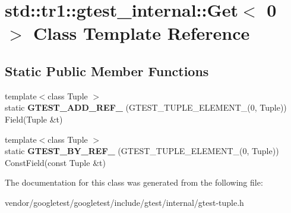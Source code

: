 \hypertarget{classstd_1_1tr1_1_1gtest__internal_1_1Get_3_010_01_4}{}\section{std\+:\+:tr1\+:\+:gtest\+\_\+internal\+:\+:Get$<$ 0 $>$ Class Template Reference}
\label{classstd_1_1tr1_1_1gtest__internal_1_1Get_3_010_01_4}
\subsection*{Static Public Member Functions}
\begin{DoxyCompactItemize}
\item 
{\footnotesize template$<$class Tuple $>$ }\\static {\bfseries G\+T\+E\+S\+T\+\_\+\+A\+D\+D\+\_\+\+R\+E\+F\+\_\+} (G\+T\+E\+S\+T\+\_\+\+T\+U\+P\+L\+E\+\_\+\+E\+L\+E\+M\+E\+N\+T\+\_\+(0, Tuple)) Field(Tuple \&t)\hypertarget{classstd_1_1tr1_1_1gtest__internal_1_1Get_3_010_01_4_a74beca3869fddfe42ee608b7f4cacb96}{}\label{classstd_1_1tr1_1_1gtest__internal_1_1Get_3_010_01_4_a74beca3869fddfe42ee608b7f4cacb96}

\item 
{\footnotesize template$<$class Tuple $>$ }\\static {\bfseries G\+T\+E\+S\+T\+\_\+\+B\+Y\+\_\+\+R\+E\+F\+\_\+} (G\+T\+E\+S\+T\+\_\+\+T\+U\+P\+L\+E\+\_\+\+E\+L\+E\+M\+E\+N\+T\+\_\+(0, Tuple)) Const\+Field(const Tuple \&t)\hypertarget{classstd_1_1tr1_1_1gtest__internal_1_1Get_3_010_01_4_a195b3853de45077f9a324c455f22d7e2}{}\label{classstd_1_1tr1_1_1gtest__internal_1_1Get_3_010_01_4_a195b3853de45077f9a324c455f22d7e2}

\end{DoxyCompactItemize}


The documentation for this class was generated from the following file\+:\begin{DoxyCompactItemize}
\item 
vendor/googletest/googletest/include/gtest/internal/gtest-\/tuple.\+h\end{DoxyCompactItemize}
